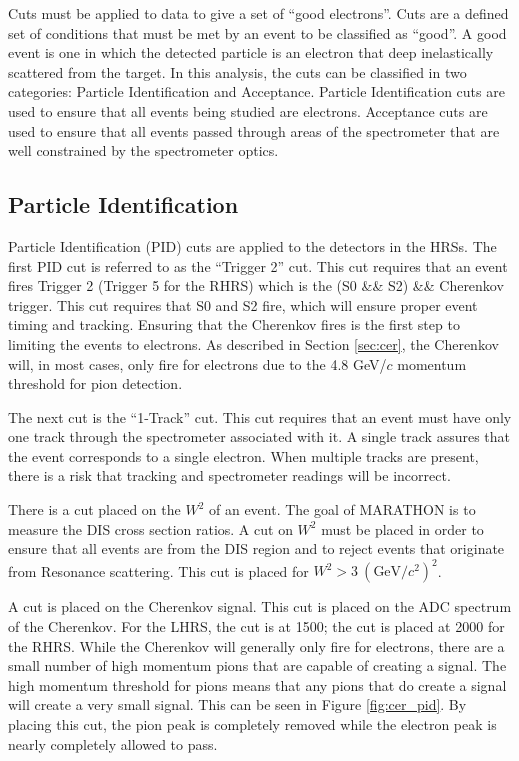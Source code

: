 Cuts must be applied to data to give a set of ``good electrons''. Cuts are a defined set of conditions that must be met by an event to be classified as ``good''. A good event is one in which the detected particle is an electron that deep inelastically scattered from the target. In this analysis, the cuts can be classified in two categories: Particle Identification and Acceptance. Particle Identification cuts are used to ensure that all events being studied are electrons. Acceptance cuts are used to ensure that all events passed through areas of the spectrometer that are well constrained by the spectrometer optics.

\subsection{Particle Identification}

Particle Identification (PID) cuts are applied to the detectors in the HRSs. The first PID cut is referred to as the ``Trigger 2'' cut. This cut requires that an event fires Trigger 2 (Trigger 5 for the RHRS) which is the (S0 \&\& S2) \&\& Cherenkov trigger. This cut requires that S0 and S2 fire, which will ensure proper event timing and tracking. Ensuring that the Cherenkov fires is the first step to limiting the events to electrons. As described in Section \ref{sec:cer}, the Cherenkov will, in most cases, only fire for electrons due to the 4.8 GeV/$c$ momentum threshold for pion detection.

The next cut is the ``1-Track'' cut. This cut requires that an event must have only one track through the spectrometer associated with it. A single track assures that the event corresponds to a single electron. When multiple tracks are present, there is a risk that tracking and spectrometer readings will be incorrect.

There is a cut placed on the $W^2$ of an event. The goal of MARATHON is to measure the DIS cross section ratios. A cut on $W^2$ must be placed in order to ensure that all events are from the DIS region and to reject events that originate from Resonance scattering. This cut is placed for $W^2>3\ \left(\text{GeV}/c^2\right)^2$.

A cut is placed on the Cherenkov signal. This cut is placed on the ADC spectrum of the Cherenkov. For the LHRS, the cut is at 1500; the cut is placed at 2000 for the RHRS. While the Cherenkov will generally only fire for electrons, there are a small number of high momentum pions that are capable of creating a signal. The high momentum threshold for pions means that any pions that do create a signal will create a very small signal. This can be seen in Figure \ref{fig:cer_pid}. By placing this cut, the pion peak is completely removed while the electron peak is nearly completely allowed to pass.

